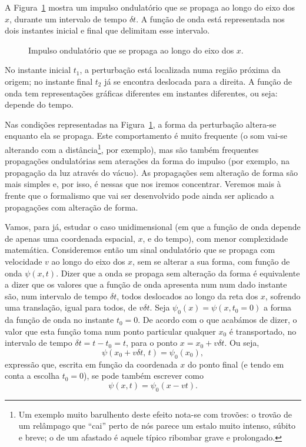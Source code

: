A Figura~\ref{fig:01-020} mostra um impulso ondulatório que se propaga ao longo
do eixo dos $x$, durante um intervalo de tempo $\delta t$. A função de onda está
representada nos dois instantes inicial e final que delimitam esse intervalo.
\begin{figure}[htb]
    {\centering
        \par
    }
    \caption{Impulso ondulatório que se propaga ao longo do eixo dos
    $x$.\label{fig:01-020}}
\end{figure}
No instante inicial $t_1$, a perturbação está localizada numa região próxima da
origem; no instante final $t_2$ já se encontra deslocada para a
direita. A função de onda tem representações gráficas diferentes em instantes
diferentes, ou seja: depende do tempo.

Nas condições representadas na Figura~\ref{fig:01-020}, a forma da perturbação
altera-se enquanto ela se propaga. Este comportamento é muito frequente (o som
vai-se alterando com a distância\footnote{Um exemplo muito barulhento deste
  efeito nota-se com trovões: o trovão de um relâmpago que ``cai'' perto de nós
  parece um estalo muito intenso, súbito e breve; o de um afastado é aquele
típico ribombar grave e prolongado.}, por exemplo), mas são também frequentes
propagações ondulatórias sem aterações da forma do impulso (por exemplo, na
propagação da luz através do vácuo). As propagações sem alteração de forma são
mais simples e, por isso, é nessas que nos iremos concentrar. Veremos mais à
frente que o formalismo que vai ser desenvolvido pode ainda ser aplicado a
propagações com alteração de forma. 

Vamos, para já, estudar o caso unidimensional (em que a função de onda depende
de apenas uma coordenada espacial, $x$, e do tempo), com menor complexidade
matemática. Consideremos então um sinal ondulatório que se propaga com
velocidade $v$ ao longo do eixo dos $x$, sem se alterar a sua forma, com função
de onda $\psi(x,t)$. Dizer que a onda se propaga sem alteração da forma é
equivalente a dizer que os valores que a função de onda apresenta num num dado
instante são, num intervalo de tempo $\delta t$, todos deslocados ao longo da
reta dos $x$, sofrendo uma translação, igual para todos, de $v\delta t$. Seja
$\psi_0(x)=\psi(x,t_0=0)$ a forma da função de onda no instante $t_0=0$. De
acordo com o que acabámos de dizer, o valor que esta função toma num ponto
particular qualquer $x_0$ é transportado, no intervalo de tempo $\delta
t=t-t_0=t$, para o ponto $x=x_0+v\delta t$. Ou seja,
\begin{equation*}
  \psi(x_0+v\delta t,\,t)=\psi_0(x_0),
\end{equation*}
expressão que, escrita em função da coordenada $x$ do ponto final (e tendo em
conta a escolha $t_0=0$), se pode também escrever como
\begin{equation*}
  \psi(x,t)=\psi_0(x-vt).
\end{equation*}

